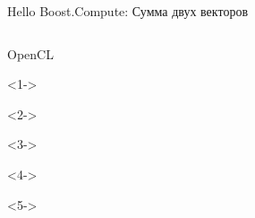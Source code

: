 \documentclass[@BEAMER_OPTIONS@]{beamer}
\begin{document}
\begin{frame}[fragile]{Hello Boost.Compute: Сумма двух векторов}
    \vspace{-1\baselineskip}
    \begin{columns}
        \begin{column}{0.2\textwidth}
            \begin{minipage}[c][\textheight][c]{\linewidth}
                \begin{exampleblock}{OpenCL}
                    \begin{adjustbox}{width=0.19\textwidth, height=\textheight, keepaspectratio}
                        \begin{minipage}{\textwidth}
                            \begin{uncoverenv}<1->
                                
                            \end{uncoverenv}
                            \begin{uncoverenv}<2->
                                
                            \end{uncoverenv}
                            \begin{uncoverenv}<3->
                                
                            \end{uncoverenv}
                            \begin{uncoverenv}<4->
                                
                            \end{uncoverenv}
                            \begin{uncoverenv}<5->
                                
                            \end{uncoverenv}
                        \end{minipage}
                    \end{adjustbox}
                \end{exampleblock}
            \end{minipage}
        \end{column}
        \begin{column}{0.7\textwidth}

\end{column}
\end{columns}
\end{frame}
\end{document}

